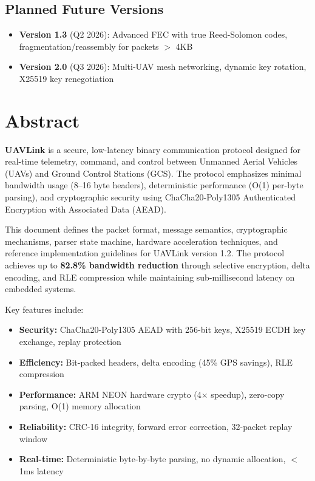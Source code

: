 \documentclass[11pt,a4paper]{article}
\begin{document}
\vspace{1cm}

\subsection*{Planned Future Versions}

\begin{itemize}[noitemsep]
\item \textbf{Version 1.3} (Q2 2026): Advanced FEC with true Reed-Solomon codes, fragmentation/reassembly for packets $>$ 4KB
\item \textbf{Version 2.0} (Q3 2026): Multi-UAV mesh networking, dynamic key rotation, X25519 key renegotiation
\end{itemize}

\newpage
\tableofcontents
\newpage

\section*{Abstract}

\textbf{UAVLink} is a secure, low-latency binary communication protocol designed for real-time telemetry, command, and control between Unmanned Aerial Vehicles (UAVs) and Ground Control Stations (GCS). The protocol emphasizes minimal bandwidth usage (8--16 byte headers), deterministic performance (O(1) per-byte parsing), and cryptographic security using ChaCha20-Poly1305 Authenticated Encryption with Associated Data (AEAD).

\vspace{0.5cm}

This document defines the packet format, message semantics, cryptographic mechanisms, parser state machine, hardware acceleration techniques, and reference implementation guidelines for UAVLink version 1.2. The protocol achieves up to \textbf{82.8\% bandwidth reduction} through selective encryption, delta encoding, and RLE compression while maintaining sub-millisecond latency on embedded systems.

\vspace{0.5cm}

Key features include:
\begin{itemize}[noitemsep]
\item \textbf{Security:} ChaCha20-Poly1305 AEAD with 256-bit keys, X25519 ECDH key exchange, replay protection
\item \textbf{Efficiency:} Bit-packed headers, delta encoding (45\% GPS savings), RLE compression
\item \textbf{Performance:} ARM NEON hardware crypto (4$\times$ speedup), zero-copy parsing, O(1) memory allocation
\item \textbf{Reliability:} CRC-16 integrity, forward error correction, 32-packet replay window
\item \textbf{Real-time:} Deterministic byte-by-byte parsing, no dynamic allocation, $<$1ms latency
\end{itemize}
\end{document}
